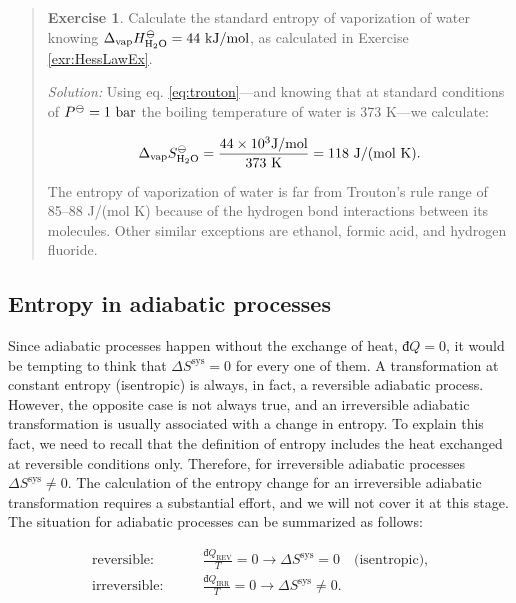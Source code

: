 \documentclass[
  9pt,
]{extbook}
\theoremstyle{definition}
\theoremstyle{definition}
\theoremstyle{definition}
\newtheorem{exercise}{Exercise}[chapter]
\theoremstyle{remark}
\begin{document}
\begin{quote}
\begin{exercise}
\protect\hypertarget{exr:troutonex}{}{\label{exr:troutonex} }Calculate the standard entropy of vaporization of water knowing \(\Delta_{\mathrm{vap}} H_{\mathrm{H}_2\mathrm{O}}^{-\kern-6pt{\ominus}\kern-6pt-}= 44 \  \text{kJ/mol}\), as calculated in Exercise \ref{exr:HessLawEx}.

\emph{Solution:} Using eq. \eqref{eq:trouton}---and knowing that at standard conditions of \(P^{-\kern-6pt{\ominus}\kern-6pt-}= 1 \  \text{bar}\) the boiling temperature of water is 373 K---we calculate:

\begin{equation}
\Delta_{\mathrm{vap}} S_{\mathrm{H}_2\mathrm{O}}^{-\kern-6pt{\ominus}\kern-6pt-}= \frac{44 \times 10^3 \text{J/mol}}{373 \ \text{K}} = 118 \  \text{J/(mol K)}.
\label{eq:trouton1}
\end{equation}

The entropy of vaporization of water is far from Trouton's rule range of 85--88 J/(mol K) because of the hydrogen bond interactions between its molecules. Other similar exceptions are ethanol, formic acid, and hydrogen fluoride.
\end{exercise}
\end{quote}

\hypertarget{entropy-in-adiabatic-processes}{%
\subsection{Entropy in adiabatic processes}\label{entropy-in-adiabatic-processes}}

Since adiabatic processes happen without the exchange of heat, \(đQ=0\), it would be tempting to think that \(\Delta S^{\mathrm{sys}} = 0\) for every one of them. A transformation at constant entropy (isentropic) is always, in fact, a reversible adiabatic process. However, the opposite case is not always true, and an irreversible adiabatic transformation is usually associated with a change in entropy. To explain this fact, we need to recall that the definition of entropy includes the heat exchanged at reversible conditions only. Therefore, for irreversible adiabatic processes \(\Delta S^{\mathrm{sys}} \neq 0\). The calculation of the entropy change for an irreversible adiabatic transformation requires a substantial effort, and we will not cover it at this stage. The situation for adiabatic processes can be summarized as follows:

\begin{equation}
\begin{aligned}
\text{reversible:} \qquad & \frac{đQ_{\mathrm{REV}}}{T} = 0 \longrightarrow \Delta S^{\mathrm{sys}} = 0 \quad \text{(isentropic),}\\
\text{irreversible:} \qquad & \frac{đQ_{\mathrm{IRR}}}{T}  = 0 \longrightarrow \Delta S^{\mathrm{sys}} \neq 0. \\
\end{aligned}
\label{eq:adiabaticent}
\end{equation}
\end{document}
